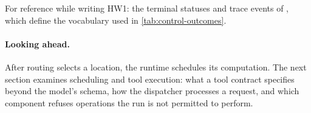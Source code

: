 For reference while writing HW1: the terminal statuses and trace events of ,
which define the vocabulary used in \cref{tab:control-outcomes}.

\paragraph{Looking ahead.} After routing selects a location, the runtime schedules its computation.
The next section examines scheduling and tool execution: what a tool contract specifies beyond
the model's schema, how the dispatcher processes a request, and which component refuses
operations the run is not permitted to perform.
